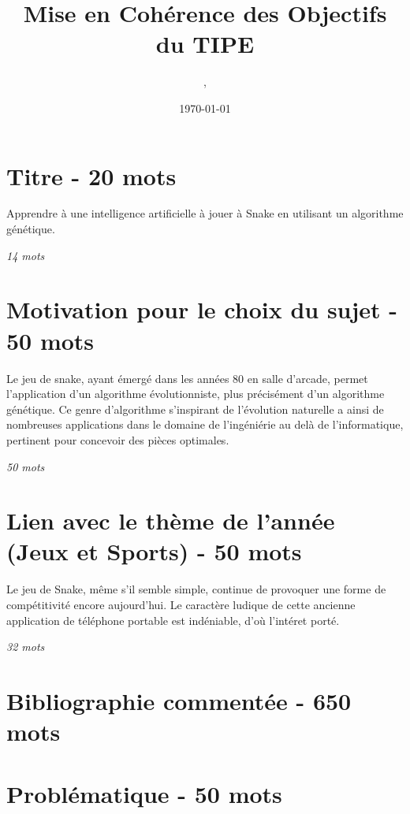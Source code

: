 \documentclass[11pt,a4paper]{article}
\author{\monNom, \maClasse}
\title{Mise en Cohérence des Objectifs du TIPE}
\date{\today}
\makeatletter
\renewcommand{\maketitle}{
  \thispagestyle{empty}
  \begin{center}
  \shadowbox{\parbox{5in}{%
     \centering%
     \textrm{\textbf{\Large \@title}}\\
     \vspace{0.2cm}
     \textrm{\large \@author}\\
     \vspace{0.2cm}
     \textrm{\large \@date}
  }} 
  \end{center}
  \null
}
\makeatother
\begin{document}
\maketitle

\tableofcontents

\thispagestyle{fancy}

\section{Titre - 20 mots}

\begin{center}
    Apprendre à une intelligence artificielle à jouer à Snake en utilisant un algorithme génétique.
\end{center}

\textit{14 mots}

\section{Motivation pour le choix du sujet - 50 mots}

Le jeu de snake, ayant émergé dans les années 80 en salle d'arcade,
permet l'application d'un algorithme évolutionniste, 
plus précisément d'un algorithme génétique.
Ce genre d'algorithme s'inspirant de l'évolution naturelle a ainsi de 
nombreuses applications dans le domaine de l'ingéniérie au delà de l'informatique, 
pertinent pour concevoir des pièces optimales.

\textit{50 mots}

\section{Lien avec le thème de l'année (Jeux et Sports) - 50 mots}

Le jeu de Snake, même s'il semble simple, continue de provoquer 
une forme de compétitivité encore aujourd'hui. 
Le caractère ludique de cette ancienne application de téléphone 
portable est indéniable, d'où l'intéret porté.

\textit{32 mots}

\section{Bibliographie commentée - 650 mots}

\section{Problématique - 50 mots}
\end{document}

